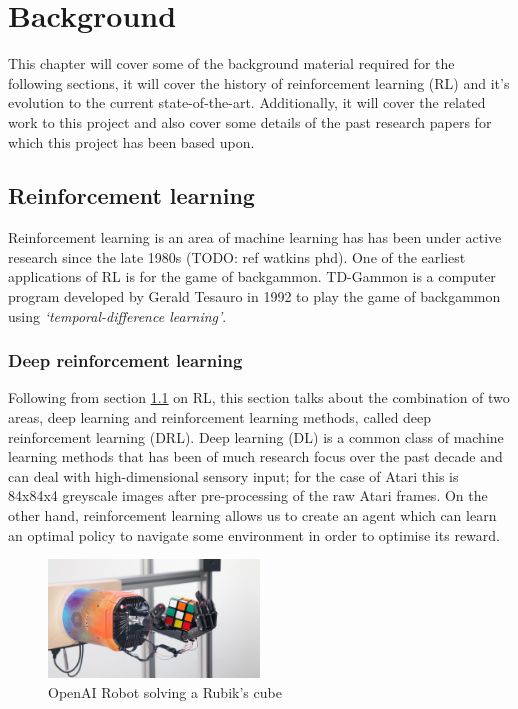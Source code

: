 \chapter{Background}
\label{cha:bg}

This chapter will cover some of the background material required for the following sections, it will cover the history of reinforcement learning (RL) and it's evolution to the current state-of-the-art. Additionally, it will cover the related work to this project and also cover some details of the past research papers for which this project has been based upon.

\section{Reinforcement learning}
\label{bg:sec:rl}
Reinforcement learning is an area of machine learning has has been under active research since the late 1980s (TODO: ref watkins phd). One of the earliest applications of RL is for the game of backgammon. TD-Gammon is a computer program developed by Gerald Tesauro in 1992 to play the game of backgammon using \textit{`temporal-difference learning'}.

\subsection{Deep reinforcement learning}
\label{bg:sec:deeprl}
Following from section \ref{bg:sec:rl} on RL, this section talks about the combination of two areas, deep learning and reinforcement learning methods, called deep reinforcement learning (DRL). Deep learning (DL) is a common class of machine learning methods that has been of much research focus over the past decade and can deal with high-dimensional sensory input; for the case of Atari this is 84x84x4 greyscale images after pre-processing of the raw Atari frames. On the other hand, reinforcement learning allows us to create an agent which can learn an optimal policy to navigate some environment in order to optimise its reward.

\begin{figure}[htbp]
	\centering
	\includegraphics[width=0.5\textwidth]{chapters/chapter2/images/openai-robot.jpg}
	\caption{OpenAI Robot solving a Rubik's cube
		\label{fig:openai-robot}
	}
\end{figure}

